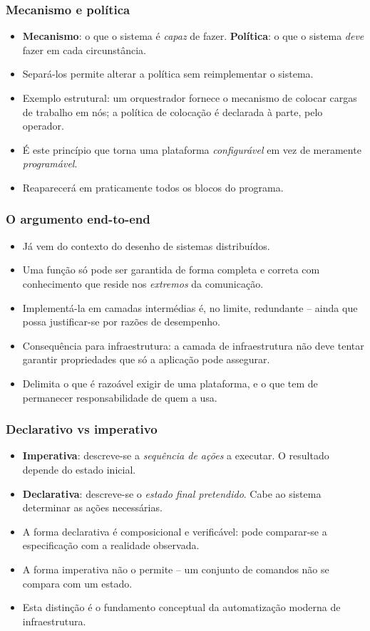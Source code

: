 \documentclass[aspectratio=169]{beamer}
\begin{document}
\begin{frame}
\frametitle{Mecanismo e política}
\begin{itemize}
    \setlength\itemsep{0.35cm}
    \item \textbf{Mecanismo}: o que o sistema é \emph{capaz} de fazer. \textbf{Política}: o que o sistema \emph{deve} fazer em cada circunstância.
    \item Separá-los permite alterar a política sem reimplementar o sistema.
    \item Exemplo estrutural: um orquestrador fornece o mecanismo de colocar cargas de trabalho em nós; a política de colocação é declarada à parte, pelo operador.
    \item É este princípio que torna uma plataforma \emph{configurável} em vez de meramente \emph{programável}.
    \item Reaparecerá em praticamente todos os blocos do programa.
\end{itemize}
\end{frame}

\begin{frame}
\frametitle{O argumento end-to-end}
\begin{itemize}
    \setlength\itemsep{0.35cm}
    \item Já vem do contexto do desenho de sistemas distribuídos.
    \item Uma função só pode ser garantida de forma completa e correta com conhecimento que reside nos \emph{extremos} da comunicação.
    \item Implementá-la em camadas intermédias é, no limite, redundante -- ainda que possa justificar-se por razões de desempenho.
    \item Consequência para infraestrutura: a camada de infraestrutura não deve tentar garantir propriedades que só a aplicação pode assegurar.
    \item Delimita o que é razoável exigir de uma plataforma, e o que tem de permanecer responsabilidade de quem a usa.
\end{itemize}
\end{frame}

\begin{frame}
\frametitle{Declarativo vs imperativo}
\begin{itemize}
    \setlength\itemsep{0.35cm}
    \item \textbf{Imperativa}: descreve-se a \emph{sequência de ações} a executar. O resultado depende do estado inicial.
    \item \textbf{Declarativa}: descreve-se o \emph{estado final pretendido}. Cabe ao sistema determinar as ações necessárias.
    \item A forma declarativa é composicional e verificável: pode comparar-se a especificação com a realidade observada.
    \item A forma imperativa não o permite -- um conjunto de comandos não se compara com um estado.
    \item Esta distinção é o fundamento conceptual da automatização moderna de infraestrutura.
\end{itemize}
\end{frame}
\end{document}
